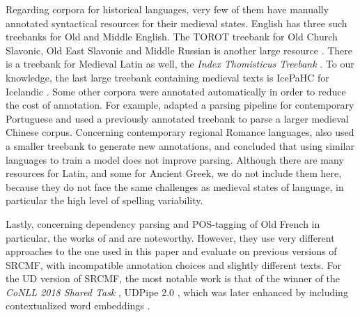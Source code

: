 

Regarding corpora for historical languages, very few of them have manually annotated syntactical resources for their medieval states. English has three such treebanks \citep{oxford-2001-the,kroch-etal-2000-the,traugott-pintzuk-2008-coding} for Old and Middle English. The TOROT treebank for Old Church Slavonic, Old East Slavonic and Middle Russian is another large resource \citep{berdicevskis-eckhoff-2020-diachronic}. There is a treebank for Medieval Latin as well, the \emph{Index Thomisticus Treebank} \citep{passarotti-2019-project}. To our knowledge, the last large treebank containing medieval texts is IcePaHC for Icelandic \citep{rognvaldsson-etal-2012-icelandic}. Some other corpora were annotated automatically in order to reduce the cost of annotation. For example, \citet{rocio-etal-2003-automated} adapted a parsing pipeline for contemporary Portuguese and \citet{lee-kong-2014-a} used a previously annotated treebank \citep{lee-kong-2012-dependency} to parse a larger medieval Chinese corpus. Concerning contemporary regional Romance languages, \citet{miletic-etal-2020-building} also used a smaller treebank to generate new annotations, and concluded that using similar languages to train a model does not improve parsing. Although there are many resources for Latin, and some for Ancient Greek, we do not include them here, because they do not face the same challenges as medieval states of language, in particular the high level of spelling variability.

Lastly, concerning dependency parsing and POS-tagging of Old French in particular, the works of \citet{guibon-etal-2014-parsing} and \citet{stein-2014-parsing, stein-2016-old} are noteworthy. However, they use very different approaches to the one used in this paper and evaluate on previous versions of SRCMF, with incompatible annotation choices and slightly different texts. For the UD version of SRCMF, the most notable work is that of the winner of the \emph{CoNLL 2018 Shared Task} \citep{zeman-etal-2018-conll}, UDPipe 2.0 \citep{straka-2018-udpipe}, which was later enhanced by including contextualized word embeddings \citep{straka-strakova-2019-evaluating}.

